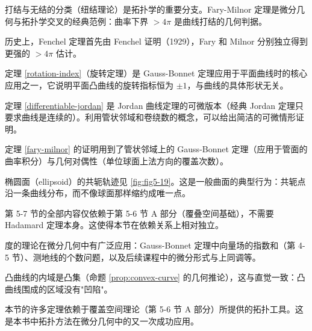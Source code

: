 \begin{Remark}
打结与无结的分类（纽结理论）是拓扑学的重要分支。Fary-Milnor 定理是微分几何与拓扑学交叉的经典范例：曲率下界 $>4\pi$ 是曲线打结的几何判据。
\end{Remark}

\begin{Remark}
历史上，Fenchel 定理首先由 Fenchel 证明（1929），Fary 和 Milnor 分别独立得到更强的 $>4\pi$ 估计。
\end{Remark}

\begin{Remark}
定理 \ref{rotation-index}（旋转定理）是 Gauss-Bonnet 定理应用于平面曲线时的核心应用之一，它说明平面凸曲线的旋转指标恒为 $\pm 1$，与曲线的具体形状无关。
\end{Remark}

\begin{Remark}
定理 \ref{differentiable-jordan} 是 Jordan 曲线定理的可微版本（经典 Jordan 定理只要求曲线是连续的）。利用管状邻域和卷绕数的概念，可以给出简洁的可微情形证明。
\end{Remark}

\begin{Remark}
定理 \ref{fary-milnor} 的证明用到了管状邻域上的 Gauss-Bonnet 定理（应用于管面的曲率积分）与几何对偶性（单位球面上法方向的覆盖次数）。
\end{Remark}

\begin{Remark}
椭圆面（ellipsoid）的共轭轨迹见 \cref{fig:fig5-19}。这是一般曲面的典型行为：共轭点沿一条曲线分布，而不像球面那样缩约成唯一点。
\end{Remark}

\begin{Remark}
第 5-7 节的全部内容仅依赖于第 5-6 节 A 部分（覆叠空间基础），不需要 Hadamard 定理本身。这使得本节在依赖关系上相对独立。
\end{Remark}

\begin{Remark}
度的理论在微分几何中有广泛应用：Gauss-Bonnet 定理中向量场的指数和（第 4-5 节）、测地线的个数问题，以及后续课程中的微分形式与上同调等。
\end{Remark}

\begin{Remark}
凸曲线的内域是凸集（命题 \ref{prop:convex-curve} 的几何推论），这与直觉一致：凸曲线围成的区域没有"凹陷"。
\end{Remark}

\begin{Remark}
本节的许多定理依赖于覆盖空间理论（第 5-6 节 A 部分）所提供的拓扑工具。这是本书中拓扑方法在微分几何中的又一次成功应用。
\end{Remark}

